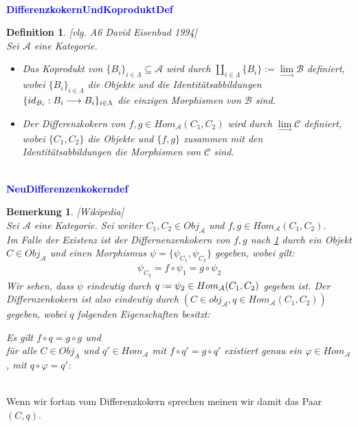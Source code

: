 \documentclass[10pt,a4paper]{report}
\newcommand{\ModulsOfDifferenzials}{David Eisenbud 1994}
\newcounter{Aussage}[chapter]
\newtheorem{bem}[Aussage]{Bemerkung}
\newtheorem{definition}[Aussage]{Definition}
\newcommand{\functionfront}[3]{\nolinebreak{#1:#2 \longrightarrow #3}}
\newcommand{\colimes}[0]{\lim\limits_{ \longrightarrow }}
\newcommand*{\defeq}{\mathrel{\vcenter{\baselineskip0.5ex \lineskiplimit0pt
                     \hbox{\scriptsize.}\hbox{\scriptsize.}}}%
                     =}
\begin{document}
\ \\
\textcolor{blue}{\textbf{DifferenzkokernUndKoproduktDef}}
\begin{definition}\label{DifferenzkokernUndKoproduktDef} \textit{[vlg. A6 \ModulsOfDifferenzials]}\\
Sei $\mathcal{A}$ eine Kategorie.
\begin{itemize}
\item Das Koprodukt von $ \lbrace B_i \rbrace_{i \in \Lambda} \subseteq \mathcal{A}$ wird durch $\coprod_{i \in \Lambda} \lbrace B_i \rbrace := \colimes\mathcal{B}$ definiert, wobei $\lbrace B_i \rbrace_{i \in \Lambda}$ die Objekte und die Identitätsabbildungen $\lbrace \functionfront{id_{B_i}}{B_i}{B_i} \rbrace_{i \in \Lambda}$ die einzigen Morphismen von $\mathcal{B}$ sind.
\item Der Differenzkokern von $f,g \in Hom_{\mathcal{A}}(C_1,C_2)$ wird durch $\colimes \mathcal{C}$ definiert,
wobei $\lbrace C_1,C_2 \rbrace$ die Objekte und $ \lbrace f,g \rbrace$ zusammen mit den Identitätsabbildungen die Morphismen von $\mathcal{C}$ sind.
\end{itemize}
\end{definition}


\ \\
\textcolor{blue}{\textbf{NeuDifferenzenkokerndef}}
\begin{bem}\label{NeuDifferenzenkokerndef} \textit{[Wikipedia]}\\
Sei $\mathcal{A}$ eine Kategorie. Sei weiter $C_1,C_2 \in Obj_{\mathcal{A}}$ und $f,g \in Hom_{\mathcal{A}}(C_1,C_2)$.\\
Im Falle der Existenz ist der Differnenzenkokern von $f,g$ nach \cref{DifferenzkokernUndKoproduktDef} durch ein Objekt $C \in Obj_{\mathcal{A}}$ und einen Morphismus $\psi = \lbrace \psi_{C_1}, \psi_{C_2}\rbrace$ gegeben, wobei gilt:
\begin{gather*}
\psi_{C_2} = f \circ \psi_1 = g \circ \psi_2
\end{gather*}
Wir sehen, dass $\psi$ eindeutig durch $q \defeq \psi_2 \in Hom_{\mathcal{A}}(C_1,C_2)$ gegeben ist. Der Differnzenkokern ist also eindeutig durch $(C \in obj_\mathcal{A},q \in Hom_{\mathcal{A}}(C_1,C_2))$ gegeben, wobei $q$ folgenden Eigenschaften besitzt:
\begin{center}
Es gilt $f \circ q = g \circ g$ und\\
für alle $C \in Obj_{A}$ und $q' \in Hom_{\mathcal{A}}$ mit $f \circ q' = g \circ q'$ existiert genau ein $\varphi \in Hom_{\mathcal{A}}$, mit $q \circ \varphi = q'$:\\
\ \\
\end{center}
\end{bem}
Wenn wir fortan vom Differenzkokern sprechen meinen wir damit das Paar $(C,q)$.
\end{document}

